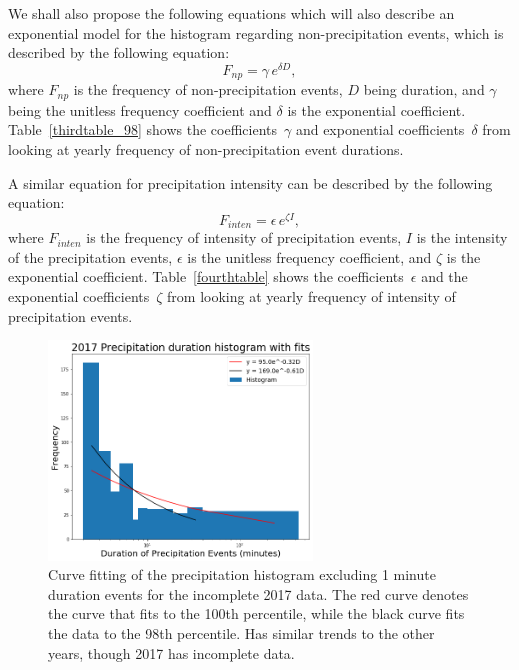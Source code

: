 \documentclass[11pt]{report}
\begin{document}
We shall also propose the following equations which will also describe an
exponential model for the histogram regarding non-precipitation events,
which is described by the following equation:
\begin{equation}\label{expod_np}
	F_{np} = \gamma \,e^{\delta D},
\end{equation}
where $F_{np}$ is the frequency of non-precipitation events, $D$ being
duration, and $\gamma $ being the unitless frequency coefficient and $\delta
$ is the exponential coefficient. Table~\ref{thirdtable_98} shows the
coefficients~$\gamma$ and exponential coefficients~$\delta$ from looking at
yearly frequency of non-precipitation event durations.

A similar equation for precipitation intensity can be described by the
following equation:
\begin{equation}\label{expod_inten}
	F_{inten} = \epsilon \,e^{\zeta I},
\end{equation}
where $F_{inten}$ is the frequency of intensity of precipitation events, $I$
is the intensity of the precipitation events, $\epsilon$ is the unitless
frequency coefficient, and $\zeta$ is the exponential
coefficient. Table~\ref{fourthtable} shows the coefficients~$\epsilon$ and
the exponential coefficients~$\zeta$ from looking at yearly frequency of
intensity of precipitation events.

\clearpage
\begin{figure}[t]
\centering
\includegraphics[width=0.625\textwidth]{Figures/precip17_new.png}
\caption[2017 precipitation duration exponentials with contrasting curve fitting]
{\label{precip17_redone}Curve fitting of the precipitation histogram
  excluding 1 minute duration events for the incomplete 2017 data. The red
  curve denotes the curve that fits to the 100th percentile, while the black
  curve fits the data to the 98th percentile. Has similar trends to the
  other years, though 2017 has incomplete data.}
\end{figure}
\end{document}
